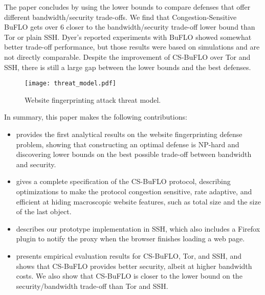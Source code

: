 \documentclass[10pt,journal]{IEEEtran}
\newcommand{\buflo} {BuFLO\xspace}
\newcommand{\csbuflo} {Congestion-Sensitive BuFLO\xspace}
\newcommand{\csb} {CS-BuFLO\xspace}
\begin{document}
The paper concludes by using the lower bounds to compare defenses that
offer different bandwidth/security trade-offs.  We find that \csbuflo
gets over 6 closer to the bandwidth/security trade-off lower
bound than Tor or plain SSH.  Dyer's reported experiments with \buflo
showed somewhat better trade-off performance, but those results were
based on simulations and are not directly comparable.  Despite the
improvement of \csb over Tor and SSH, there is still a large gap
between the lower bounds and the best defenses.















\begin{figure*}[t]
  \centering
  \texttt{[image: threat\_model.pdf]}
  \caption{\label{fig:threat-model} Website fingerprinting attack threat model.}
\end{figure*}

In summary, this paper makes the following contributions:
\begin{itemize}
  \item {} provides the first analytical results on
    the website fingerprinting defense problem, showing that
    constructing an optimal defense is NP-hard and discovering lower
    bounds on the best possible trade-off between bandwidth and
    security.
  \item {} gives a complete specification of the
    \csb protocol, describing optimizations to make the protocol
    congestion sensitive, rate adaptive, and efficient at hiding
    macroscopic website features, such as total size and the size of
    the last object.
  \item {} describes our prototype
    implementation in SSH, which also includes a Firefox plugin to
    notify the proxy when the browser finishes loading a web page.
  \item {} presents empirical evaluation results
    for \csb, Tor, and SSH, and shows that \csb provides better
    security, albeit at higher bandwidth costs.  We also show that
    \csb is closer to the lower bound on the security/bandwidth
    trade-off than Tor and SSH.
\end{itemize}
\end{document}
